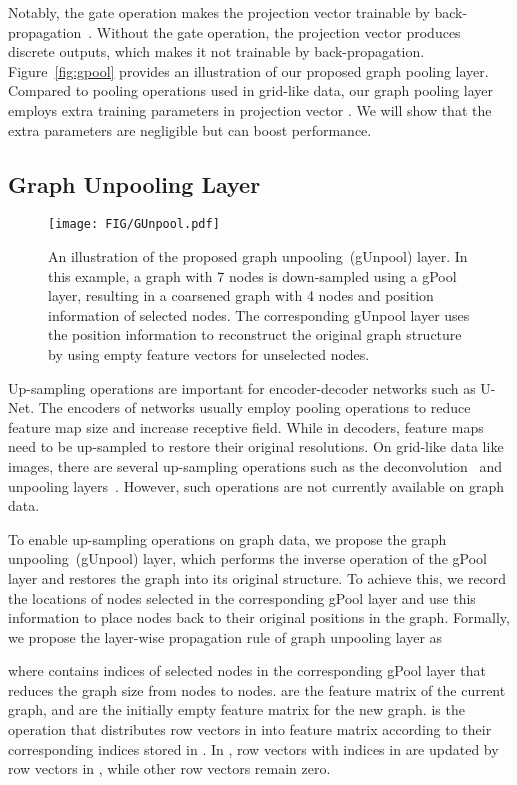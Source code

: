 \documentclass{article}
\begin{document}
Notably, the gate operation makes the projection vector 
trainable by back-propagation~\citep{lecun2012efficient}. Without the
gate operation, the projection vector  produces discrete
outputs, which makes it not trainable by back-propagation.
Figure~\ref{fig:gpool} provides an illustration of our proposed
graph pooling layer. Compared to pooling operations used in
grid-like data, our graph pooling layer employs extra training
parameters in projection vector . We will show that the
extra parameters are negligible but can boost performance.

\subsection{Graph Unpooling Layer}

\begin{figure*}[t]  \centering
\texttt{[image: FIG/GUnpool.pdf]}
\caption{An illustration of the proposed graph unpooling~(gUnpool)
layer. In this example, a graph with 7 nodes is down-sampled using a
gPool layer, resulting in a coarsened graph with 4 nodes and
position information of selected nodes. The corresponding gUnpool
layer uses the position information to reconstruct the original
graph structure by using empty feature vectors for unselected
nodes.} \label{fig:gunpool} \end{figure*}

Up-sampling operations are important for encoder-decoder networks
such as U-Net. The encoders of networks usually employ pooling
operations to reduce feature map size and increase receptive field.
While in decoders, feature maps need to be up-sampled to restore
their original resolutions. On grid-like data like images, there are
several up-sampling operations such as the
deconvolution~\citep{isola2017image,Zhao2015StackedWA} and
unpooling layers~\citep{long2015fully}.
However, such operations are not currently
available on graph data.

To enable up-sampling operations on graph data, we propose the graph
unpooling~(gUnpool) layer, which performs the inverse operation of
the gPool layer and restores the graph into its original structure.
To achieve this, we record the locations of nodes selected in the
corresponding gPool layer and use this information to place nodes
back to their original positions in the graph. Formally, we propose
the layer-wise propagation rule of graph unpooling layer as

where  contains indices of selected
nodes in the corresponding gPool layer that reduces the graph size
from  nodes to  nodes. 
are the feature matrix of the current graph, and  are
the initially empty feature matrix for the new graph.
 is the
operation that distributes row vectors in  into
 feature matrix according to their corresponding
indices stored in . In , row vectors with
indices in  are updated by row vectors in ,
while other row vectors remain zero.
\end{document}
